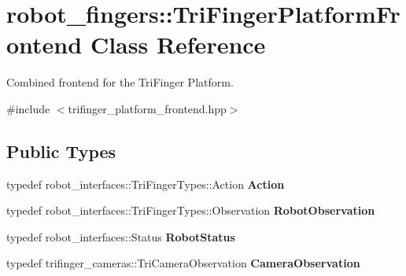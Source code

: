\hypertarget{classrobot__fingers_1_1TriFingerPlatformFrontend}{}\section{robot\+\_\+fingers\+:\+:Tri\+Finger\+Platform\+Frontend Class Reference}
\label{classrobot__fingers_1_1TriFingerPlatformFrontend}


Combined frontend for the Tri\+Finger Platform.  




{\ttfamily \#include $<$trifinger\+\_\+platform\+\_\+frontend.\+hpp$>$}

\subsection*{Public Types}
\begin{DoxyCompactItemize}
\item 
\mbox{\label{classrobot__fingers_1_1TriFingerPlatformFrontend_af657fd0a6ea4023926ab23a225ca3bab}} 
typedef robot\+\_\+interfaces\+::\+Tri\+Finger\+Types\+::\+Action {\bfseries Action}
\item 
\mbox{\label{classrobot__fingers_1_1TriFingerPlatformFrontend_a993606d1334ac3d932ba9b9637388cab}} 
typedef robot\+\_\+interfaces\+::\+Tri\+Finger\+Types\+::\+Observation {\bfseries Robot\+Observation}
\item 
\mbox{\label{classrobot__fingers_1_1TriFingerPlatformFrontend_a2bb400ff94b8c528fd3be4a3112bda81}} 
typedef robot\+\_\+interfaces\+::\+Status {\bfseries Robot\+Status}
\item 
\mbox{\label{classrobot__fingers_1_1TriFingerPlatformFrontend_a96f578b30c6f8e2220a8cbccc91974c1}} 
typedef trifinger\+\_\+cameras\+::\+Tri\+Camera\+Observation {\bfseries Camera\+Observation}
\end{DoxyCompactItemize}
